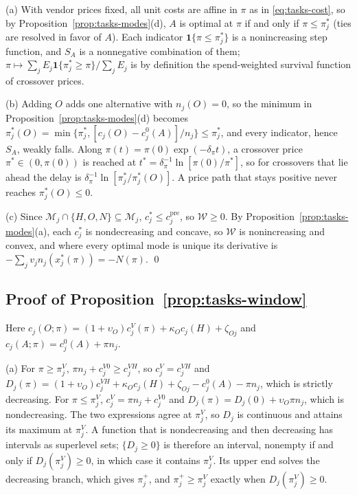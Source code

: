 (a) With vendor prices fixed, all unit costs are affine in $\pi$ as in \eqref{eq:tasks-cost}, so by Proposition~\ref{prop:tasks-modes}(d), $A$ is optimal at $\pi$ if and only if $\pi\le\pi^*_j$ (ties are resolved in favor of $A$). Each indicator $\mathbf 1\{\pi\le\pi^*_j\}$ is a nonincreasing step function, and $S_A$ is a nonnegative combination of them; $\pi\mapsto\sum_jE_j\mathbf 1\{\pi^*_j\ge\pi\}/\sum_jE_j$ is by definition the spend-weighted survival function of crossover prices.

(b) Adding $O$ adds one alternative with $n_j(O)=0$, so the minimum in Proposition~\ref{prop:tasks-modes}(d) becomes $\pi^*_j(O)=\min\{\pi^*_j,[c_j(O)-c^0_j(A)]/n_j\}\le\pi^*_j$, and every indicator, hence $S_A$, weakly falls. Along $\pi(t)=\pi(0)\exp(-\delta_\pi t)$, a crossover price $\pi^*\in(0,\pi(0))$ is reached at $t^*=\delta_\pi^{-1}\ln[\pi(0)/\pi^*]$, so for crossovers that lie ahead the delay is $\delta_\pi^{-1}\ln[\pi^*_j/\pi^*_j(O)]$. A price path that stays positive never reaches $\pi^*_j(O)\le 0$.

(c) Since $\mathcal M_j\cap\{H,O,N\}\subseteq\mathcal M_j$, $c^*_j\le c^{\mathrm{pre}}_j$, so $\mathcal W\ge 0$. By Proposition~\ref{prop:tasks-modes}(a), each $c^*_j$ is nondecreasing and concave, so $\mathcal W$ is nonincreasing and convex, and where every optimal mode is unique its derivative is $-\sum_jv_jn_j(x^*_j(\pi))=-N(\pi)$. \qed

\subsection*{Proof of Proposition~\ref{prop:tasks-window}}

Here $c_j(O;\pi)=(1+\upsilon_O)c^V_j(\pi)+\kappa_Oc_j(H)+\zeta_{Oj}$ and $c_j(A;\pi)=c^0_j(A)+\pi n_j$.

(a) For $\pi\ge\pi^V_j$, $\pi n_j+c^{V0}_j\ge c^{VH}_j$, so $c^V_j=c^{VH}_j$ and $D_j(\pi)=(1+\upsilon_O)c^{VH}_j+\kappa_Oc_j(H)+\zeta_{Oj}-c^0_j(A)-\pi n_j$, which is strictly decreasing. For $\pi\le\pi^V_j$, $c^V_j=\pi n_j+c^{V0}_j$ and $D_j(\pi)=D_j(0)+\upsilon_O\pi n_j$, which is nondecreasing. The two expressions agree at $\pi^V_j$, so $D_j$ is continuous and attains its maximum at $\pi^V_j$. A function that is nondecreasing and then decreasing has intervals as superlevel sets; $\{D_j\ge 0\}$ is therefore an interval, nonempty if and only if $D_j(\pi^V_j)\ge 0$, in which case it contains $\pi^V_j$. Its upper end solves the decreasing branch, which gives $\pi^+_j$, and $\pi^+_j\ge\pi^V_j$ exactly when $D_j(\pi^V_j)\ge 0$.

